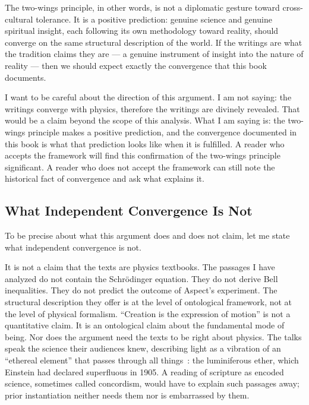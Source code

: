 The two-wings principle, in other words, is not a diplomatic gesture toward
cross-cultural tolerance.
It is a positive prediction: genuine science and genuine spiritual insight,
each following its own methodology toward reality, should converge on the same
structural description of the world.
If the \bahai writings are what the \bahai tradition claims they are --- a genuine
instrument of insight into the nature of reality --- then we should expect exactly
the convergence that this book documents.

I want to be careful about the direction of this argument.
I am not saying: the writings converge with physics, therefore the writings are
divinely revealed.
That would be a claim beyond the scope of this analysis.
What I am saying is: the two-wings principle makes a positive prediction, and
the convergence documented in this book is what that prediction looks like when
it is fulfilled.
A reader who accepts the \bahai framework will find this confirmation of the
two-wings principle significant.
A reader who does not accept the \bahai framework can still note the historical
fact of convergence and ask what explains it.

\subsection*{What Independent Convergence Is Not}

To be precise about what this argument does and does not claim, let me state
what independent convergence is not.

It is not a claim that the \bahai texts are physics textbooks.
The passages I have analyzed do not contain the Schrödinger equation.
They do not derive Bell inequalities.
They do not predict the outcome of Aspect's experiment.
The structural description they offer is at the level of ontological framework,
not at the level of physical formalism.
``Creation is the expression of motion'' is not a quantitative claim.
It is an ontological claim about the fundamental mode of being.
Nor does the argument need the texts to be right about physics.
The talks speak the science their audiences knew, describing light as a
vibration of an ``ethereal element'' that passes through all
things~\citep[Talk 58]{PUP}: the luminiferous ether, which Einstein had declared
superfluous in 1905.
A reading of scripture as encoded science, sometimes called concordism, would
have to explain such passages away; prior instantiation neither needs them nor
is embarrassed by them.

